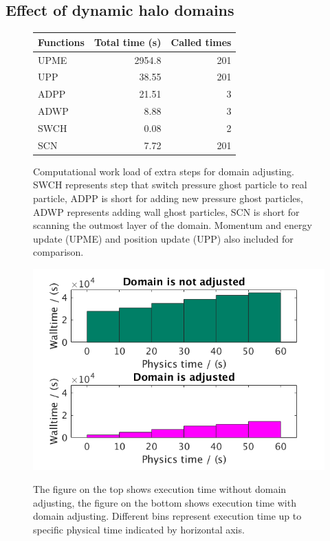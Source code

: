 \subsection{Effect of dynamic halo domains}
\begin{figure}
{	  
    \begin{tabular}{lrr}
    \hline
    Functions & Total time (s) & Called times\\
    	\hline
    UPME & 2954.8 & 201 \\
    UPP & 38.55 &  201 \\
    ADPP & 21.51 & 3 \\
    ADWP  & 8.88 & 3 \\
    SWCH & 0.08 &  2 \\
    SCN  & 7.72 & 201 \\
    \hline
  \end{tabular}
}
{\caption{Computational work load of extra steps for domain adjusting. SWCH represents step that switch pressure ghost particle to real particle, ADPP is short for adding new pressure ghost particles, ADWP represents adding wall ghost particles, SCN is short for scanning the outmost layer of the domain.  Momentum and energy update (UPME) and position update (UPP) also included for comparison.}
\label{tab:Computational_cost_doamin_adj}}
{\includegraphics[scale=0.35]{Chapter-5/Figures/adj_vs_no}}
{\caption{The figure on the top shows execution time without domain adjusting, the figure on the bottom shows execution time with domain adjusting. Different bins represent execution time up to specific physical time indicated by horizontal axis.}
\label{fig:adj_vs_no}}
\end{figure}
